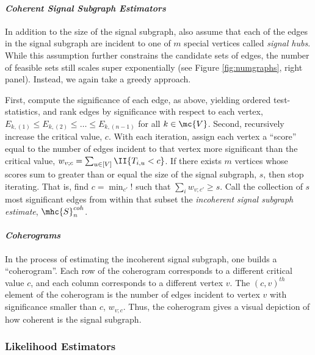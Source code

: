 \documentclass[10pt,journal,cspaper,compsoc]{IEEEtran}
\begin{document}
\paragraph{\emph{Coherent Signal Subgraph Estimators}}

In addition to the size of the signal subgraph, also assume that each of the edges in the signal subgraph are incident to one of $m$ special vertices called \emph{signal hubs}. While this assumption further constrains the candidate sets of edges, the number of feasible sets still scales super exponentially (see Figure \ref{fig:numgraphs}, right panel).  Instead, we again take a greedy approach.  

First, compute the significance of each edge, as above, yielding ordered test-statistics, and rank edges by significance with respect to each vertex,  $E_{k,(1)} \leq E_{k,(2)} \leq \ldots \leq E_{k,(n-1)}$ for all $k \in \mc{V}$.  Second, recursively increase the critical value, $c$. With each iteration, assign each vertex a ``score'' equal to the number of edges incident to that vertex more significant than the critical value, $w_{v;c}=\sum_{u \in [V]} \II\{T_{i,u} < c\}$.  If there exists $m$ vertices whose scores sum to greater than or equal the size of the signal subgraph, $s$, then stop iterating.  That is, find $c=\min_{c'} !$ such that $\sum_{i} w_{v;c'}\geq s$.  Call the collection of $s$ most significant edges from within that subset the \emph{incoherent signal subgraph estimate}, $\mhc{S}^{coh}_n$. %

\paragraph{\emph{Coherograms}}

In the process of estimating the incoherent signal subgraph, one builds a ``coherogram''.  Each row of the coherogram corresponds to a different critical value $c$, and each column corresponds to a different vertex $v$.  The $(c,v)^{th}$ element of the coherogram is the number of edges incident to vertex $v$ with significance smaller than $c$, $w_{v;c}$.  Thus, the coherogram gives a visual depiction of how coherent is the signal subgraph.


\subsubsection{Likelihood Estimators} %
\label{sub:likelihood}
\end{document}
